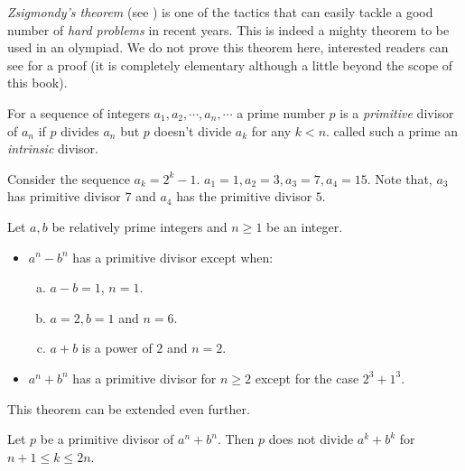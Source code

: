 \textit{Zsigmondy's theorem} (see \textcite{zsigmondy,birkhoff_vandiver_1904}) is one of the tactics that can easily tackle a good number of \textit{hard problems} in recent years. This is indeed a mighty theorem to be used in an olympiad. We do not prove this theorem here, interested readers can see \textcite[$\S6.2$]{billal_riasat_2021} for a proof (it is completely elementary although a little beyond the scope of this book).
	\begin{definition}
		For a sequence of integers $a_1,a_2,\cdots,a_n,\cdots$ a prime number $p$ is a \textit{primitive} divisor of $a_n$ if $p$ divides $a_n$ but $p$ doesn't divide $a_k$ for any $k<n$. \textcite{carmichael,carmichael2} called such a prime an \textit{intrinsic} divisor.
	\end{definition}

	\begin{example}
		Consider the sequence $a_k=2^k-1$. $a_1=1,a_2=3,a_3=7,a_4=15$. Note that, $a_3$ has primitive divisor $7$ and $a_4$ has the primitive divisor $5$.
	\end{example}

	\begin{theorem}
		Let $a,b$ be relatively prime integers and $n\geq1$ be an integer.
			\begin{itemize}
				\item $a^n-b^n$ has a primitive divisor except when:
					\begin{enumerate}[(a)]
						\item $a-b=1$, $n=1$.
						\item $a=2,b=1$ and $n=6$.
						\item $a+b$ is a power of $2$ and $n=2$.
					\end{enumerate}
				\item $a^n+b^n$ has a primitive divisor for $n\geq2$ except for the case $2^3+1^3$.
			\end{itemize}\label{thm:zsigmondy}
	\end{theorem}
This theorem can be extended even further.
	\begin{theorem}
		Let $p$ be a primitive divisor of $a^n+b^n$. Then $p$ does not divide $a^k+b^k$ for $n+1\leq k\leq2n$.
	\end{theorem}

